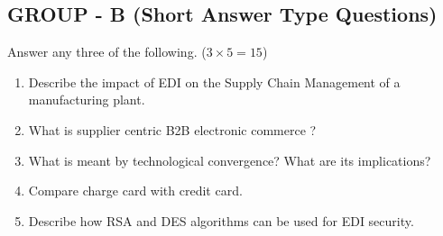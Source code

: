 \documentclass{article}
\begin{document}
\subsection*{GROUP - B (Short Answer Type Questions)}
Answer any three of the following. ($3 \times 5 = 15$)
\begin{enumerate}
    \item[2.] Describe the impact of EDI on the Supply Chain Management of a manufacturing plant.
    \item[3.] What is supplier centric B2B electronic commerce ?
    \item[4.] What is meant by technological convergence? What are its implications?
    \item[5.] Compare charge card with credit card.
    \item[6.] Describe how RSA and DES algorithms can be used for EDI security.
\end{enumerate}
\end{document}
